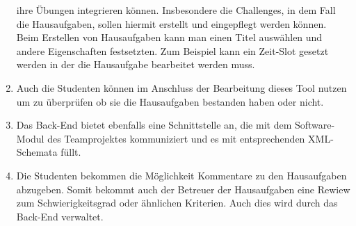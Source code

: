 \begin{enumerate}
   		 ihre \"Ubungen integrieren k\"onnen. Insbesondere die Challenges, in dem Fall die Hausaufgaben, sollen hiermit erstellt und 
		 eingepflegt werden k\"onnen. Beim Erstellen von Hausaufgaben kann man einen Titel ausw\"ahlen und andere Eigenschaften
		 festsetzten. Zum Beispiel kann ein Zeit-Slot gesetzt werden in der die Hausaufgabe bearbeitet werden muss. 
	\item Auch die Studenten k\"onnen im Anschluss der Bearbeitung dieses Tool nutzen um zu \"uberpr\"ufen
		 ob sie die Hausaufgaben bestanden haben oder nicht. 
	\item Das Back-End bietet ebenfalls eine Schnittstelle an, die mit dem Software-Modul des Teamprojektes kommuniziert und es mit 
		entsprechenden XML-Schemata f\"ullt.
	\item Die Studenten bekommen die M\"oglichkeit Kommentare zu den Hausaufgaben abzugeben. Somit bekommt auch der Betreuer der
		Hausaufgaben eine Rewiew zum Schwierigkeitsgrad oder \"ahnlichen Kriterien. Auch dies wird durch das Back-End verwaltet.
\end{enumerate}



